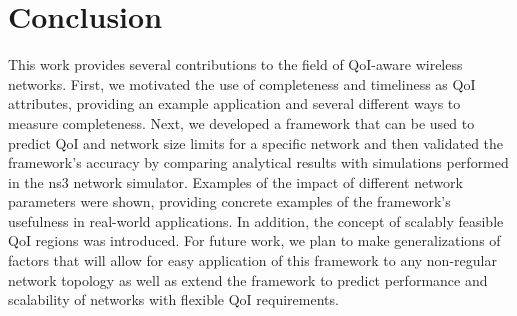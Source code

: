 
\section{Conclusion}
\label{sec:conclusion}

This work provides several contributions to the field of QoI-aware wireless networks.  
First, we motivated the use of completeness and timeliness as QoI attributes, providing an example application and several different ways to measure completeness.  
Next, we developed a framework that can be used to predict QoI and network size limits for a specific network and then validated the framework's accuracy by comparing analytical results with simulations performed in the ns3 network simulator.
Examples of the impact of different network parameters were shown, providing concrete examples of the framework's usefulness in real-world applications.  In addition, the concept of scalably feasible QoI regions was introduced.
For future work, we plan to make generalizations of factors that will allow for easy application of this framework to any non-regular network topology as well as extend the framework to predict performance and scalability of networks with flexible QoI requirements.  %